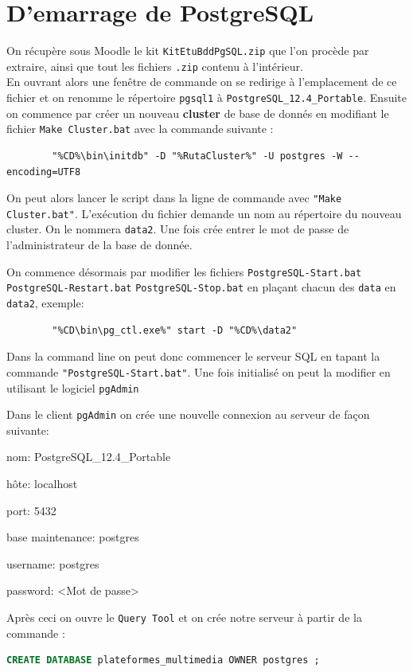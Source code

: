 \documentclass[11pt, openright]{book}
\begin{document}




\newpage

\section{D'emarrage de PostgreSQL}

On récupère sous Moodle le kit \texttt{KitEtuBddPgSQL.zip} que l'on procède par extraire, ainsi que tout les fichiers \texttt{.zip} contenu à l'intérieur. \\
En ouvrant alors une fenêtre de commande on se redirige à l'emplacement de ce fichier et on renomme le répertoire \texttt{pgsql1} à \texttt{PostgreSQL\_12.4\_Portable}. Ensuite on commence par créer un nouveau \textbf{cluster} de base de donnés en modifiant le fichier \texttt{Make Cluster.bat} avec la commande suivante :
\begin{lstlisting}
		"%CD%\bin\initdb" -D "%RutaCluster%" -U postgres -W --encoding=UTF8
	\end{lstlisting}

On peut alors lancer le script dans la ligne de commande avec \texttt{"Make Cluster.bat"}. L'exécution du fichier demande un nom au répertoire du nouveau cluster. On le nommera \texttt{data2}. Une fois crée entrer le mot de passe de l'administrateur de la base de donnée.

On commence désormais par modifier les fichiers \texttt{PostgreSQL-Start.bat} \texttt{PostgreSQL-Restart.bat} \texttt{PostgreSQL-Stop.bat} en plaçant chacun des \texttt{data} en \texttt{data2}, exemple:
\begin{lstlisting}
		"%CD\bin\pg_ctl.exe%" start -D "%CD%\data2"
	\end{lstlisting}

Dans la command line on peut donc commencer le serveur SQL en tapant la commande \texttt{"PostgreSQL-Start.bat"}. Une fois initialisé on peut la modifier en utilisant le logiciel \texttt{pgAdmin}

Dans le client \texttt{pgAdmin} on crée une nouvelle connexion au serveur de façon suivante:
\begin{items}{-15pt}{-15pt}
	\item nom: PostgreSQL\_12.4\_Portable
	\item hôte: localhost
	\item port: 5432
	\item base maintenance: postgres
	\item username: postgres
	\item password: <Mot de passe>
\end{items}
Après ceci on ouvre le \texttt{Query Tool} et on crée notre serveur à partir de la commande :
\begin{lstlisting}[language=SQL]
		CREATE DATABASE plateformes_multimedia OWNER postgres ;
	\end{lstlisting}
\end{document}
